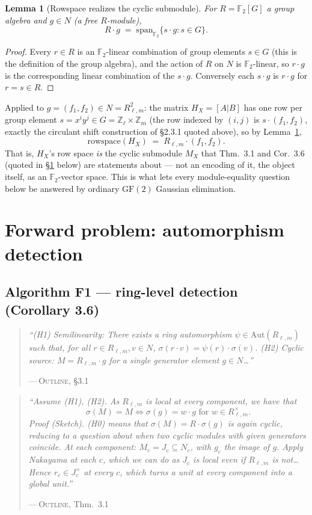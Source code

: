 \documentclass[11pt]{article}
\theoremstyle{plain}
\newtheorem{lem}[thm]{Lemma}
\theoremstyle{definition}
\newenvironment{paperquote}[1]{%
  \def\paperquotecite{#1}%
  \begin{quotation}\noindent\itshape\small
}{%
  \normalfont\par\hfill---\,\textsc{Outline}, \paperquotecite\medskip
  \end{quotation}
}
\newcommand{\pq}[2]{\begin{paperquote}{#1}#2\end{paperquote}}
\begin{document}
\begin{lem}[Rowspace realizes the cyclic submodule]
\label{lem:rowspace}
For $R=\mathbb{F}_2[G]$ a group algebra and $g\in N$ (a free $R$-module),
\[ R\cdot g \;=\; \mathrm{span}_{\mathbb{F}_2}\{s\cdot g : s\in G\}. \]
\end{lem}
\begin{proof}
Every $r\in R$ is an $\mathbb{F}_2$-linear combination of group elements
$s\in G$ (this is the definition of the group algebra), and the action of
$R$ on $N$ is $\mathbb{F}_2$-linear, so $r\cdot g$ is the corresponding
linear combination of the $s\cdot g$. Conversely each $s\cdot g$ is $r\cdot
g$ for $r=s\in R$.
\end{proof}

Applied to $g=(f_1,f_2)\in N=R_{\ell,m}^2$: the matrix $H_X=[A|B]$ has one
row per group element $s=x^iy^j\in G=\mathbb{Z}_\ell\times\mathbb{Z}_m$
(the row indexed by $(i,j)$ is $s\cdot(f_1,f_2)$, exactly the circulant
shift construction of \S2.3.1 quoted above), so by Lemma~\ref{lem:rowspace},
\[ \mathrm{rowspace}(H_X) \;=\; R_{\ell,m}\cdot(f_1,f_2). \]
That is, $H_X$'s row space \emph{is} the cyclic submodule $M_X$ that Thm.\
3.1 and Cor.\ 3.6 (quoted in \S\ref{sec:forward} below) are statements
about --- not an encoding of it, the object itself, as an
$\mathbb{F}_2$-vector space. This is what lets every module-equality
question below be answered by ordinary $\mathrm{GF}(2)$ Gaussian
elimination.

\section{Forward problem: automorphism detection}
\label{sec:forward}

\subsection{Algorithm F1 --- ring-level detection (Corollary 3.6)}

\pq{\S3.1}{%
``(H1) Semilinearity: There exists a ring automorphism $\psi\in
\mathrm{Aut}(R_{\ell,m})$ such that, for all $r\in R_{\ell,m}, v\in N$,
$\sigma(r\cdot v)=\psi(r)\cdot\sigma(v)$.
(H2) Cyclic source: $M=R_{\ell,m}\cdot g$ for a single generator element
$g\in N$\ldots''
}

\pq{Thm.\ 3.1}{%
``Assume (H1), (H2). As $R_{\ell,m}$ is local at every component, we have
that
\[ \sigma(M)=M \iff \sigma(g)=w\cdot g \text{ for } w\in R_{\ell,m}^\times.
\]
Proof (Sketch). (H0) means that $\sigma(M)=R\cdot\sigma(g)$ is again
cyclic, reducing to a question about when two cyclic modules with given
generators coincide. At each component: $M_c=J_c\subseteq N_c$, with $g_c$
the image of $g$. Apply Nakayama at each $c$, which we can do as $J_c$ is
local even if $R_{\ell,m}$ is not\ldots Hence $r_c\in J_c^\times$ at every
$c$, which turns a unit at every component into a global unit.''
}
\end{document}
